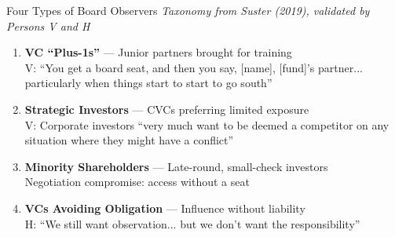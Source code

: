 \documentclass[aspectratio=169,12pt]{beamer}
\begin{document}
\begin{frame}{Four Types of Board Observers}
\small
\textit{Taxonomy from Suster (2019), validated by Persons V and H}
\vspace{0.3em}

\begin{enumerate}
\item \textbf{VC ``Plus-1s''} --- Junior partners brought for training \\
\textcolor{harvardgray}{\footnotesize V: ``You get a board seat, and then you say, [name], [fund]'s partner... particularly when things start to start to go south''}

\item \textbf{Strategic Investors} --- CVCs preferring limited exposure \\
\textcolor{harvardgray}{\footnotesize V: Corporate investors ``very much want to be deemed a competitor on any situation where they might have a conflict''}

\item \textbf{Minority Shareholders} --- Late-round, small-check investors \\
\textcolor{harvardgray}{\footnotesize Negotiation compromise: access without a seat}

\item \textbf{VCs Avoiding Obligation} --- Influence without liability \\
\textcolor{harvardcrimson}{\footnotesize H: ``We still want observation... but we don't want the responsibility''}
\end{enumerate}
\end{frame}
\end{document}
